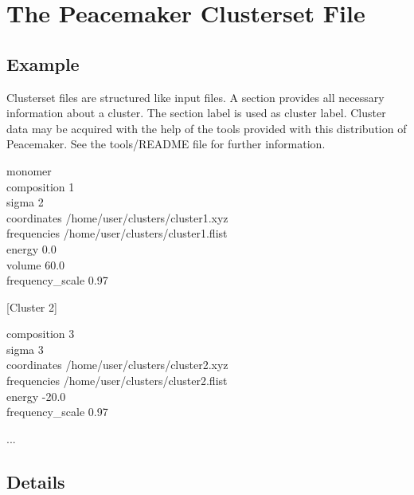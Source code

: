 \documentclass{scrartcl}
\begin{document}
\section{The Peacemaker Clusterset File}
\label{sec:clusterset}

\subsection{Example}

Clusterset files are structured like input files.
A section provides all necessary information about a cluster.
The section label is used as cluster label.
Cluster data may be acquired with the help of the tools provided with this distribution of Peacemaker.
See the tools/README file for further information.

\clearpage
\begin{addmargin}[1cm]{0cm}
    \ttfamily
    [Cluster 1]
    \begin{addmargin}[1cm]{0cm}
        monomer \\
        composition 1 \\
        sigma 2 \\
        coordinates /home/user/clusters/cluster1.xyz \\
        frequencies /home/user/clusters/cluster1.flist \\
        energy 0.0 \\
        volume 60.0 \\
        frequency\_scale 0.97
    \end{addmargin}
    [Cluster 2]
    \begin{addmargin}[1cm]{0cm}
        composition 3 \\
        sigma 3 \\
        coordinates /home/user/clusters/cluster2.xyz \\
        frequencies /home/user/clusters/cluster2.flist \\
        energy -20.0 \\
        frequency\_scale 0.97
    \end{addmargin}
    ...
\end{addmargin}

\subsection{Details}
\end{document}
